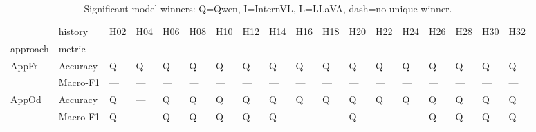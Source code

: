 \begin{table}[tbp]
\caption{Significant model winners: Q=Qwen, I=InternVL, L=LLaVA, dash=no unique winner.}
\label{tab:rq1b_significant_model_winners}
\begin{tabular}{llllllllllllllllll}
\toprule
 & history & H02 & H04 & H06 & H08 & H10 & H12 & H14 & H16 & H18 & H20 & H22 & H24 & H26 & H28 & H30 & H32 \\
approach & metric &  &  &  &  &  &  &  &  &  &  &  &  &  &  &  &  \\
\midrule
\multirow[t]{2}{*}{AppFr} & Accuracy & Q & Q & Q & Q & Q & Q & Q & Q & Q & Q & Q & Q & Q & Q & Q & Q \\
 & Macro-F1 & — & — & — & — & — & — & — & — & — & — & — & — & — & — & — & — \\
\cline{1-18}
\multirow[t]{2}{*}{AppOd} & Accuracy & Q & — & Q & Q & Q & Q & Q & Q & Q & Q & Q & Q & Q & Q & Q & Q \\
 & Macro-F1 & Q & — & Q & Q & Q & Q & Q & — & — & Q & — & — & Q & Q & Q & Q \\
\cline{1-18}
\bottomrule
\end{tabular}
\end{table}
